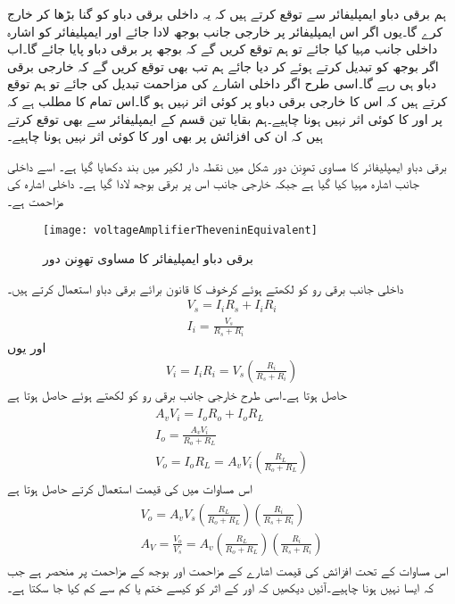 ہم برقی دباو ایمپلیفائر سے توقع کرتے ہیں کہ یہ داخلی برقی دباو کو  گنا بڑھا کر خارج کرے گا۔یوں اگر اس ایمپلیفائر پر خارجی جانب  بوجھ لادا جائے اور ایمپلیفائر  کو  اشارہ داخلی جانب مہیا کیا جائے تو ہم توقع کریں گے کہ بوجھ پر  برقی دباو پایا جائے گا۔اب اگر بوجھ کو تبدیل کرتے ہوئے  کر دیا جائے ہم تب بھی توقع کریں گے کہ خارجی برقی دباو  ہی رہے گا۔اسی طرح اگر داخلی اشارے کی مزاحمت  تبدیل کی جائے تو ہم توقع کرتے ہیں کہ اس کا خارجی برقی دباو پر کوئی اثر نہیں ہو گا۔اس تمام کا مطلب ہے کہ  پر  اور  کا کوئی اثر نہیں ہونا چاہیے۔ہم بقایا تین قسم کے ایمپلیفائر سے بھی توقع کرتے ہیں کہ ان کی افزائش پر بھی  اور  کا کوئی اثر نہیں ہونا چاہیے۔

 برقی دباو ایمپلیفائر کا مساوی تھوِنن  دور شکل  میں نقطہ دار لکیر میں بند دکھایا گیا ہے۔ اسے داخلی جانب اشارہ  مہیا کیا گیا ہے جبکہ خارجی جانب اس پر برقی بوجھ  لادا گیا ہے۔ داخلی اشارہ کی مزاحمت  ہے۔
\begin{figure}
\centering
\texttt{[image: voltageAmplifierTheveninEquivalent]}
\caption{برقی دباو ایمپلیفائر کا مساوی تھوِنن  دور}
\label{شکل_واپسی_دباو_ایمپلیفائر_تھیونن_مساوی}
\end{figure}
داخلی جانب برقی رو کو   لکھتے ہوئے کرخوف کا قانون برائے برقی دباو استعمال کرتے ہیں۔
\begin{align*}
V_s=I_i R_s+I_i R_i \\
I_i = \frac{V_s}{R_s +R_i}
\end{align*}
اور یوں
\begin{align}
V_i=I_i R_i =V_s \left(\frac{R_i}{R_s+R_i} \right)
\end{align}
حاصل ہوتا ہے۔اسی طرح خارجی جانب برقی رو کو  لکھتے ہوئے حاصل  ہوتا ہے
\begin{gather}
\begin{aligned}\label{مساوات_واپسی_بنیادی_خارجی_حقائق_الف}
A_v V_i = I_o R_o + I_o R_L\\
I_o=\frac{A_v V_i}{R_o + R_L}\\
V_o=I_o R_L = A_v V_i  \left(\frac{R_L}{R_o+R_L}\right)
\end{aligned}
\end{gather}
اس مساوات میں  کی قیمت استعمال کرتے حاصل ہوتا ہے
\begin{gather} \label{مساوات_واپسی_دباو_ایمپلیفائر_کی_افزائش}
\begin{aligned}
V_o=A_v V_s \left (\frac{R_L }{R_o+R_L} \right)  \left (\frac{R_i}{R_s+R_i} \right) \\
A_V=\frac{V_o}{V_s}=A_v \left(\frac{R_L}{R_o+R_L} \right) \left(\frac{R_i}{R_s+R_i} \right )
\end{aligned}
\end{gather}
اس مساوات کے تحت افزائش کی قیمت اشارے کے مزاحمت  اور  بوجھ کے مزاحمت  پر منحصر ہے جب کہ ایسا نہیں ہونا چاہیے۔آئیں دیکھیں کہ  اور   کے اثر کو کیسے ختم یا کم سے کم کیا جا سکتا ہے۔

